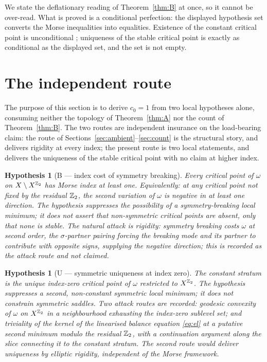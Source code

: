 \documentclass[11pt]{article}
\numberwithin{equation}{section}
\theoremstyle{plain}
\newtheorem{hypothesis}[theorem]{Hypothesis}
\theoremstyle{definition}
\theoremstyle{remark}
\begin{document}
We state the deflationary reading of Theorem~\ref{thm:B} at once,
so it cannot be over-read. What is proved is a conditional
perfection: the displayed hypothesis set converts the Morse
inequalities into equalities. Existence of the constant critical
point is unconditional \cite{MEF3}; uniqueness of the stable
critical point is exactly as conditional as the displayed set, and
the set is not empty.

\section{The independent route}\label{sec:retreat}

The purpose of this section is to derive $c_{0} = 1$ from two local
hypotheses alone, consuming neither the topology of
Theorem~\ref{thm:A} nor the count of Theorem~\ref{thm:B}. The two
routes are independent insurance on the load-bearing claim: the
route of Sections~\ref{sec:ambient}--\ref{sec:count} is the
structural story, and delivers rigidity at every index; the present
route is two local statements, and delivers the uniqueness of the
stable critical point with no claim at higher index.

\begin{hypothesis}[B --- index cost of symmetry
breaking]\label{o1:break}
Every critical point of $\omega$ on $X \setminus X^{\mathbb{Z}_2}$ has
Morse index at least one. Equivalently: at any critical point not
fixed by the residual $\mathbb{Z}_2$, the second variation of $\omega$ is
negative in at least one direction. The hypothesis suppresses the
possibility of a symmetry-breaking local minimum; it does not
assert that non-symmetric critical points are absent, only that
none is stable. The natural attack is rigidity: symmetry breaking
costs $\omega$ at second order, the $\sigma$-partner pairing
forcing the breaking mode and its partner to contribute with
opposite signs, supplying the negative direction; this is recorded
as the attack route and not claimed.
\end{hypothesis}

\begin{hypothesis}[U --- symmetric uniqueness at index
zero]\label{o1:symuniq}
The constant stratum is the unique index-zero critical point of
$\omega$ restricted to $X^{\mathbb{Z}_2}$. The hypothesis suppresses a
second, non-constant symmetric local minimum; it does not constrain
symmetric saddles. Two attack routes are recorded: geodesic
convexity of $\omega$ on $X^{\mathbb{Z}_2}$ in a neighbourhood exhausting
the index-zero sublevel set; and triviality of the kernel of the
linearised balance equation \eqref{eq:el} at a putative second
minimum modulo the residual $\mathbb{Z}_2$, with a continuation argument
along the slice connecting it to the constant stratum. The second
route would deliver uniqueness by elliptic rigidity, independent of
the Morse framework.
\end{hypothesis}
\end{document}
